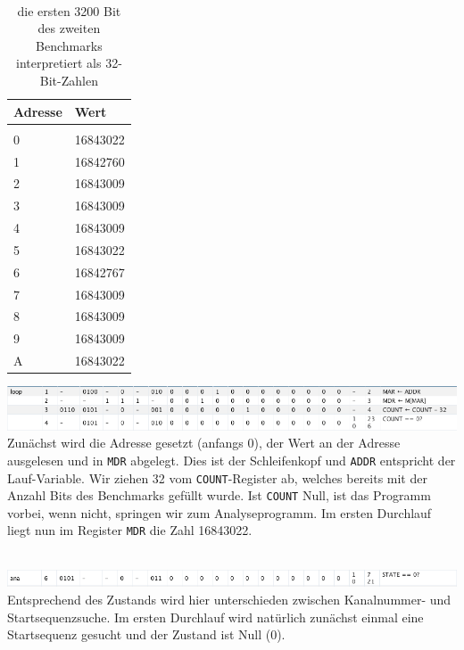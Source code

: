 \documentclass[12pt,titlepage]{article}
\begin{document}
\leavevmode \\

\begin{table}[h!]
    \begin{tabular}{l|l}
    Adresse & Wert            \\
    \hline                    \\
    0     & 16843022  \\
    1     & 16842760  \\
    2     & 16843009  \\
    3     & 16843009  \\
    4     & 16843009  \\
    5     & 16843022  \\
    6     & 16842767  \\
    7     & 16843009  \\
    8     & 16843009  \\
    9     & 16843009  \\
    A     & 16843022  \\
    \end{tabular}
    \caption{die ersten 3200 Bit des zweiten Benchmarks interpretiert als 32-Bit-Zahlen}
\end{table}


\includegraphics[width=16cm]{listing/row1-4.png}
\leavevmode \\
Zunächst wird die Adresse gesetzt (anfangs 0), der Wert an der Adresse ausgelesen und in \texttt{MDR} abgelegt.
Dies ist der Schleifenkopf und \texttt{ADDR} entspricht der Lauf-Variable.
Wir ziehen 32 vom \texttt{COUNT}-Register ab, welches bereits mit der Anzahl Bits des Benchmarks gefüllt wurde.
Ist \texttt{COUNT} Null, ist das Programm vorbei, wenn nicht, springen wir zum Analyseprogramm.
Im ersten Durchlauf liegt nun im Register \texttt{MDR} die Zahl 16843022.

\leavevmode \\
\includegraphics[width=16cm]{listing/row6.png}
\leavevmode \\
Entsprechend des Zustands wird hier unterschieden zwischen Kanalnummer- und Startsequenzsuche. Im ersten Durchlauf
wird natürlich zunächst einmal eine Startsequenz gesucht und der Zustand ist Null (0).
\end{document}
